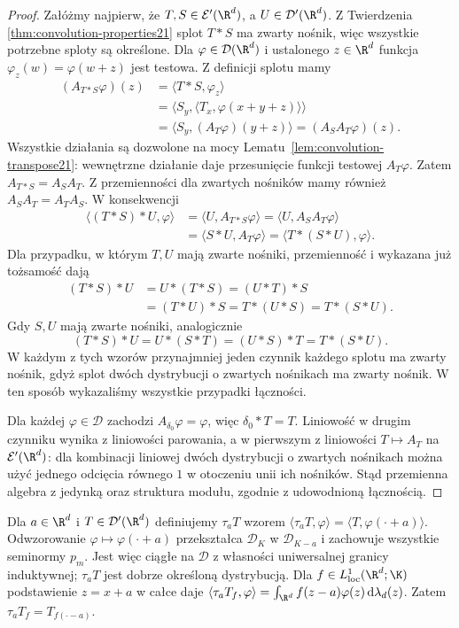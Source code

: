 \begin{proof}
Załóżmy najpierw, że $T,S\in\mathcal E'(\R^d)$,
a $U\in\mathcal D'(\R^d)$. Z Twierdzenia~
\ref{thm:convolution-properties21} splot $T*S$ ma zwarty
nośnik, więc wszystkie potrzebne sploty są określone.
Dla $\varphi\in\mathcal D(\R^d)$ i ustalonego $z\in\R^d$
funkcja $\varphi_z(w)=\varphi(w+z)$ jest testowa.
Z definicji splotu mamy
\[
\begin{aligned}
 (A_{T*S}\varphi)(z)
 &=\langle T*S,\varphi_z\rangle\\
 &=\langle S_y,\langle T_x,\varphi(x+y+z)\rangle\rangle\\
 &=\langle S_y,(A_T\varphi)(y+z)\rangle
 =(A_S A_T\varphi)(z).
\end{aligned}
\]
Wszystkie działania są dozwolone na mocy
Lematu~\ref{lem:convolution-transpose21}: wewnętrzne
działanie daje przesunięcie funkcji testowej $A_T\varphi$.
Zatem $A_{T*S}=A_S A_T$. Z przemienności dla zwartych
nośników mamy również $A_S A_T=A_T A_S$.
W konsekwencji
\[
\begin{aligned}
 \langle (T*S)*U,\varphi\rangle
 &=\langle U,A_{T*S}\varphi\rangle
 =\langle U,A_S A_T\varphi\rangle\\
 &=\langle S*U,A_T\varphi\rangle
 =\langle T*(S*U),\varphi\rangle .
\end{aligned}
\]
Dla przypadku, w którym $T,U$ mają zwarte nośniki,
przemienność i wykazana już tożsamość dają
\[
\begin{aligned}
 (T*S)*U&=U*(T*S)=(U*T)*S\\
 &=(T*U)*S=T*(U*S)=T*(S*U).
\end{aligned}
\]
Gdy $S,U$ mają zwarte nośniki, analogicznie
\[
 (T*S)*U=U*(S*T)=(U*S)*T=T*(S*U).
\]
W każdym z tych wzorów przynajmniej jeden czynnik
każdego splotu ma zwarty nośnik, gdyż splot dwóch
dystrybucji o zwartych nośnikach ma zwarty nośnik.
W ten sposób wykazaliśmy wszystkie przypadki łączności.

Dla każdej $\varphi\in\mathcal D$ zachodzi
$A_{\delta_0}\varphi=\varphi$, więc $\delta_0*T=T$.
Liniowość w drugim czynniku wynika z liniowości
parowania, a w pierwszym z liniowości
$T\mapsto A_T$ na $\mathcal E'(\R^d)$: dla kombinacji
liniowej dwóch dystrybucji o zwartych nośnikach można
użyć jednego odcięcia równego $1$ w otoczeniu unii
ich nośników.
Stąd przemienna algebra z jedynką oraz struktura
modułu, zgodnie z udowodnioną łącznością.
\end{proof}

\begin{definicja}
\label{def:translation21}
Dla $a\in\R^d$ i $T\in\mathcal D'(\R^d)$ definiujemy
$\tau_aT$ wzorem
$\langle\tau_aT,\varphi\rangle=
\langle T,\varphi(\cdot+a)\rangle$.
Odwzorowanie $\varphi\mapsto\varphi(\cdot+a)$
przekształca $\mathcal D_K$ w $\mathcal D_{K-a}$ i
zachowuje wszystkie seminormy $p_m$. Jest więc ciągłe
na $\mathcal D$ z własności uniwersalnej granicy
induktywnej; $\tau_aT$ jest dobrze określoną dystrybucją.
Dla $f\in L^1_{\mathrm{loc}}(\R^d;\K)$ podstawienie
$z=x+a$ w całce daje
$\langle\tau_aT_f,\varphi\rangle
=\int_{\R^d}f(z-a)\varphi(z)\,\mathrm d\lambda_d(z)$.
Zatem $\tau_aT_f=T_{f(\cdot-a)}$.
\end{definicja}

